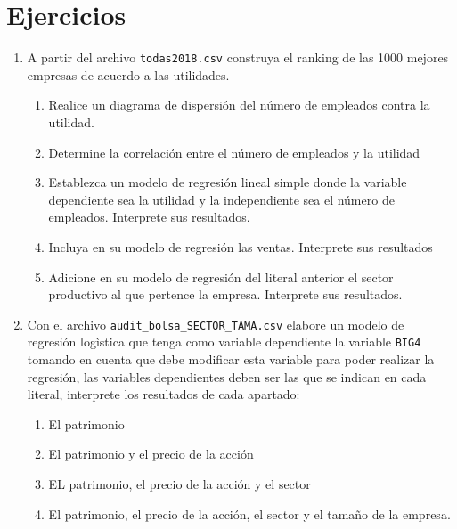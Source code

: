 \documentclass[
]{krantz}
\providecommand{\tightlist}{%
  \setlength{\itemsep}{0pt}\setlength{\parskip}{0pt}}
\begin{document}
\newpage

\hypertarget{ejercicios-2}{%
\section{Ejercicios}\label{ejercicios-2}}

\begin{enumerate}
\def\labelenumi{\arabic{enumi}.}
\item
  A partir del archivo \texttt{todas2018.csv} construya el ranking de las 1000 mejores empresas de acuerdo a las utilidades.

  \begin{enumerate}
  \def\labelenumii{\alph{enumii}.}
  \tightlist
  \item
    Realice un diagrama de dispersión del número de empleados contra la utilidad.
  \item
    Determine la correlación entre el número de empleados y la utilidad
  \item
    Establezca un modelo de regresión lineal simple donde la variable dependiente sea la utilidad y la independiente sea el número de empleados. Interprete sus resultados.
  \item
    Incluya en su modelo de regresión las ventas. Interprete sus resultados
  \item
    Adicione en su modelo de regresión del literal anterior el sector productivo al que pertence la empresa. Interprete sus resultados.
  \end{enumerate}
\item
  Con el archivo \texttt{audit\_bolsa\_SECTOR\_TAMA.csv} elabore un modelo de regresión logìstica que tenga como variable dependiente la variable \texttt{BIG4} tomando en cuenta que debe modificar esta variable para poder realizar la regresión, las variables dependientes deben ser las que se indican en cada literal, interprete los resultados de cada apartado:

  \begin{enumerate}
  \def\labelenumii{\alph{enumii}.}
  \tightlist
  \item
    El patrimonio
  \item
    El patrimonio y el precio de la acción
  \item
    EL patrimonio, el precio de la acción y el sector
  \item
    El patrimonio, el precio de la acción, el sector y el tamaño de la empresa.
  \end{enumerate}
\end{enumerate}

  

\backmatter
\printindex
\end{document}
